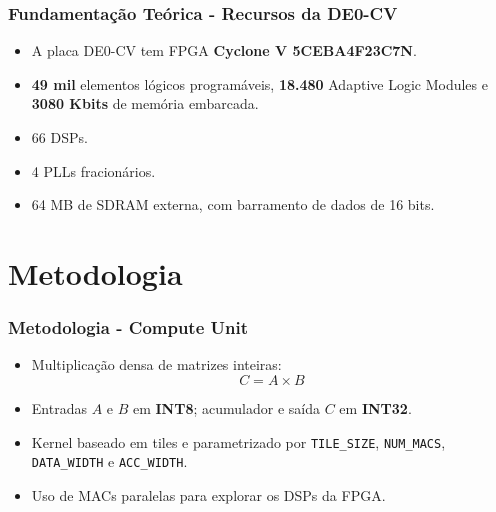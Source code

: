 \documentclass{beamer}
\begin{document}
\begin{frame}
\frametitle{Fundamentação Teórica - Recursos da DE0-CV}

\begin{itemize}
    \item A placa DE0-CV tem FPGA \textbf{Cyclone V 5CEBA4F23C7N}\supercite{terasic2015de0cv}.
    \item \textbf{49 mil} elementos lógicos programáveis, \textbf{18.480} Adaptive Logic Modules e \textbf{3080 Kbits} de memória embarcada\supercite{terasic2015de0cv}.
    \item 66 DSPs\supercite{terasic2015de0cv}.
    \item 4 PLLs fracionários\supercite{terasic2015de0cv}.
    \item 64 MB de SDRAM externa, com barramento de dados de 16 bits\supercite{terasic2015de0cv}.
\end{itemize}

\end{frame}

\section{Metodologia}

\begin{frame}
\frametitle{Metodologia - Compute Unit}

\begin{itemize}
    \item Multiplicação densa de matrizes inteiras:
    \[
        C = A \times B
    \]
    \item Entradas \(A\) e \(B\) em \textbf{INT8}; acumulador e saída \(C\) em \textbf{INT32}.
    \item Kernel baseado em tiles e parametrizado por \texttt{TILE\_SIZE}, \texttt{NUM\_MACS}, \texttt{DATA\_WIDTH} e \texttt{ACC\_WIDTH}.
    \item Uso de MACs paralelas para explorar os DSPs da FPGA.
\end{itemize}

\end{frame}
\end{document}

